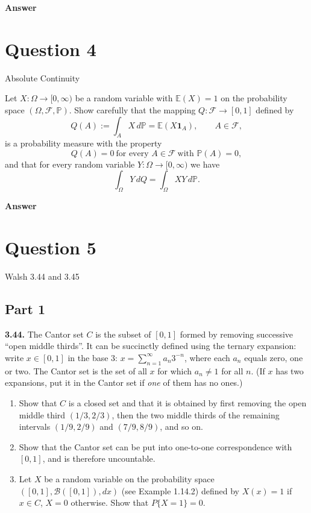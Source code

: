 \documentclass[letterpaper]{article}
\begin{document}
		
		\textbf{Answer}
		
		\clearpage
		
		\section{Question 4}
		
		{\color{deepred}Absolute Continuity}
		
		
		Let $X:\Omega\to[0,\infty)$ be a random variable with $\mathbb{E}(X)=1$ on the
		probability space $(\Omega,\mathcal{F},\mathbb{P})$. Show carefully that the
		mapping $Q:\mathcal{F}\to[0,1]$ defined by
		\[
		Q(A):=\int_A X\,d\mathbb{P}=\mathbb{E}(X\mathbf{1}_A), \qquad A\in\mathcal{F},
		\]
		is a probability measure with the property
		\[
		Q(A)=0 \ \text{for every } A\in\mathcal{F}\ \text{with } \mathbb{P}(A)=0,
		\]
		and that for every random variable $Y:\Omega\to[0,\infty)$ we have
		\[
		\int_\Omega Y\,dQ=\int_\Omega XY\,d\mathbb{P}.
		\]
		
		\textbf{Answer}
		
		\clearpage
		
		\section{Question 5}
		
			{\color{deepred} Walsh 3.44 and 3.45}
		
		\subsection{Part 1}
		\textbf{3.44.} The Cantor set $C$ is the subset of $[0,1]$ formed by removing successive
		“open middle thirds”. It can be succinctly defined using the ternary expansion:
		write $x \in [0,1]$ in the base $3$: $x = \sum_{n=1}^{\infty} a_n 3^{-n}$, where each
		$a_n$ equals zero, one or two. The Cantor set is the set of all $x$ for which
		$a_n \neq 1$ for all $n$. (If $x$ has two expansions, put it in the Cantor set if
		\emph{one} of them has no ones.)
		
		\begin{enumerate}
			\item[(a)] Show that $C$ is a closed set and that it is obtained by first removing the
			open middle third $(1/3, 2/3)$, then the two middle thirds of the remaining
			intervals $(1/9, 2/9)$ and $(7/9, 8/9)$, and so on.
			
			\item[(b)] Show that the Cantor set can be put into one-to-one correspondence with
			$[0,1]$, and is therefore uncountable.
			
			\item[(c)] Let $X$ be a random variable on the probability space
			$([0,1], \mathcal{B}([0,1]), dx)$ (see Example 1.14.2) defined by
			$X(x) = 1$ if $x \in C$, $X = 0$ otherwise. Show that
			$P\{X = 1\} = 0$.
		\end{enumerate}
	
\end{document}
